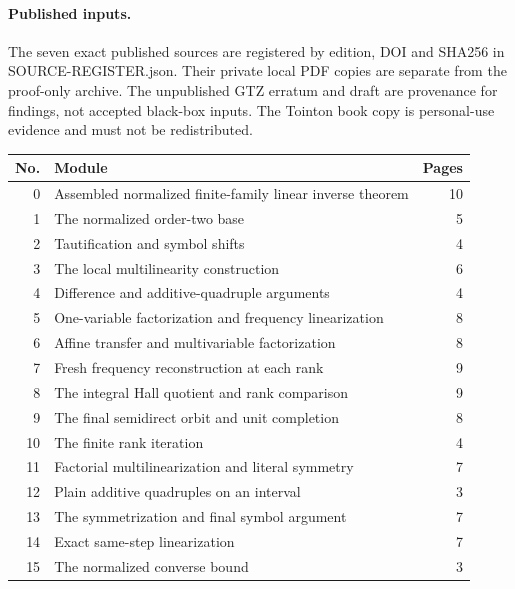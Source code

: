 \documentclass[11pt]{article}
\begin{document}
\paragraph{Published inputs.} The seven exact published sources are registered by edition, DOI and SHA256 in SOURCE-REGISTER.json. Their private local PDF copies are separate from the proof-only archive. The unpublished GTZ erratum and draft are provenance for findings, not accepted black-box inputs. The Tointon book copy is personal-use evidence and must not be redistributed.
\begin{longtable}{r p{} r}
No. & Module & Pages\\\hline
0 & Assembled normalized finite-family linear inverse theorem & 10\\
1 & The normalized order-two base & 5\\
2 & Tautification and symbol shifts & 4\\
3 & The local multilinearity construction & 6\\
4 & Difference and additive-quadruple arguments & 4\\
5 & One-variable factorization and frequency linearization & 8\\
6 & Affine transfer and multivariable factorization & 8\\
7 & Fresh frequency reconstruction at each rank & 9\\
8 & The integral Hall quotient and rank comparison & 9\\
9 & The final semidirect orbit and unit completion & 8\\
10 & The finite rank iteration & 4\\
11 & Factorial multilinearization and literal symmetry & 7\\
12 & Plain additive quadruples on an interval & 3\\
13 & The symmetrization and final symbol argument & 7\\
14 & Exact same-step linearization & 7\\
15 & The normalized converse bound & 3\\
\end{longtable}
\end{document}
